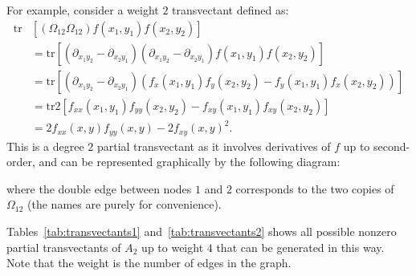 \documentclass[review,onefignum,onetabnum]{siamonline190516}
\begin{document}
For example, consider a weight $2$ transvectant defined as:
\begin{align*}
    \mbox{tr} &\left[(\Omega_{12}\Omega_{12}) f(x_1, y_1)f(x_2, y_2)\right] \\
    &= \mbox{tr}\left[(\partial_{x_1 y_2} - \partial_{x_2y_1})(\partial_{x_1 y_2} -
    \partial_{x_2y_1})f(x_1, y_1)f(x_2, y_2)\right]\\
    &= \mbox{tr}\left[\left(\partial_{x_1 y_2} - \partial_{x_2 y_1}\right)\left(f_x(x_1, y_1)f_y(x_2, y_2) - f_y(x_1, y_1)f_x(x_2, y_2)\right)\right] \\
    &= \mbox{tr} 2 \left[f_{xx}(x_1, y_1)f_{yy}(x_2, y_2) - f_{xy}(x_1, y_1)f_{xy}(x_2, y_2)\right] \\
    &= 2 f_{xx}(x, y) f_{yy}(x, y) - 2 f_{xy}(x, y)^2.
\end{align*}
This is a degree $2$ partial transvectant as it involves derivatives of $f$
up to second-order, and can be represented graphically by the following
diagram:
\begin{center}
\end{center}
where the double edge between nodes $1$ and $2$ corresponds to the two copies of $\Omega_{12}$ (the names are purely for convenience).

Tables~\ref{tab:transvectants1} and~\ref{tab:transvectants2} shows all possible nonzero partial
transvectants of $A_2$ up to weight $4$ that can be generated in this way.
Note that the weight is the number of edges in the graph.
\end{document}
